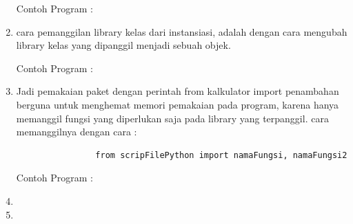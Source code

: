 \begin{enumerate}
					Contoh Program :
					
					
			\item cara pemanggilan library kelas dari instansiasi, adalah dengan cara mengubah library kelas yang dipanggil menjadi sebuah objek.
			
			Contoh Program : 
			
			
			\item Jadi pemakaian paket dengan perintah from kalkulator import penambahan berguna untuk menghemat memori pemakaian pada program, karena hanya memanggil fungsi yang diperlukan saja pada library yang terpanggil. cara memanggilnya dengan cara :
				\begin{verbatim}
				from scripFilePython import namaFungsi, namaFungsi2
				\end{verbatim}
				
			Contoh Program :
			
			
			\item 
			
			\item 
			
		\end{enumerate}
		
